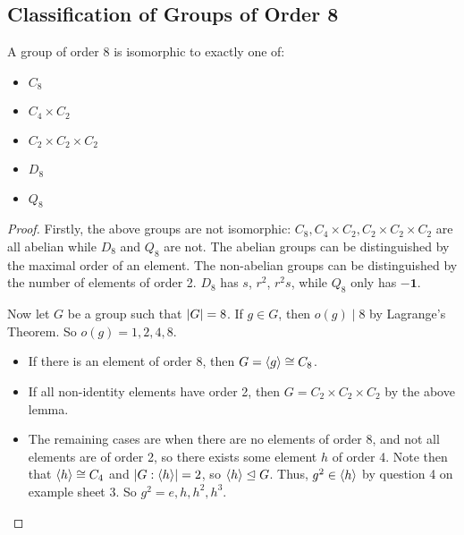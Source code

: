 \documentclass{article}
\begin{document}
	\subsection{Classification of Groups of Order 8}
	\begin{theorem}
		A group of order 8 is isomorphic to exactly one of:
		\begin{itemize}
			\item $C_8$
			\item $C_4 \times C_2$
			\item $C_2 \times C_2 \times C_2$
			\item $D_8$
			\item $Q_8$
		\end{itemize}
	\end{theorem}
	\begin{proof}
		Firstly, the above groups are not isomorphic: $C_8, C_4 \times C_2, C_2 \times C_2 \times C_2$ are all abelian while $D_8$ and $Q_8$ are not. The abelian groups can be distinguished by the maximal order of an element. The non-abelian groups can be distinguished by the number of elements of order 2. $D_8$ has $s$, $r^2$, $r^2s$, while $Q_8$ only has $-\bm 1$.

		Now let $G$ be a group such that $\abs{G} = 8$. If $g \in G$, then $o(g) \mid 8$ by Lagrange's Theorem. So $o(g) = 1, 2, 4, 8$.
		\begin{itemize}
			\item If there is an element of order 8, then $G = \langle g \rangle \cong C_8$.
			\item If all non-identity elements have order 2, then $G = C_2 \times C_2 \times C_2$ by the above lemma.
			\item The remaining cases are when there are no elements of order 8, and not all elements are of order 2, so there exists some element $h$ of order 4. Note then that $\langle h \rangle \cong C_4$ and $\abs{G:\langle h \rangle} = 2$, so $\langle h \rangle \trianglelefteq G$. Thus, $g^2 \in \langle h \rangle$ by question 4 on example sheet 3. So $g^2 = e, h, h^2, h^3$.
			

\end{itemize}
\end{proof}
\end{document}
